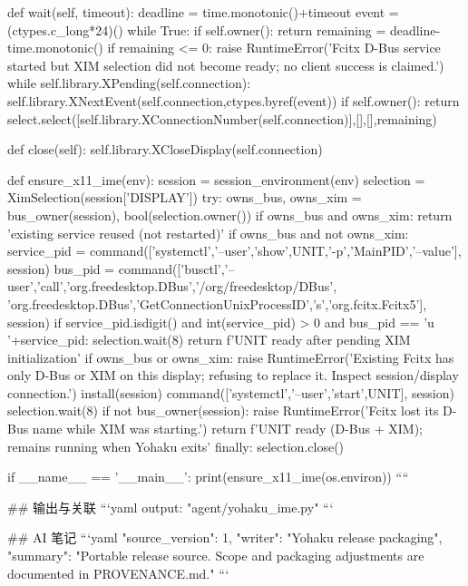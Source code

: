     def wait(self, timeout):
        deadline = time.monotonic()+timeout
        event = (ctypes.c_long*24)()
        while True:
            if self.owner():
                return
            remaining = deadline-time.monotonic()
            if remaining <= 0:
                raise RuntimeError('Fcitx D-Bus service started but XIM selection did not become ready; no client success is claimed.')
            while self.library.XPending(self.connection):
                self.library.XNextEvent(self.connection,ctypes.byref(event))
            if self.owner():
                return
            select.select([self.library.XConnectionNumber(self.connection)],[],[],remaining)

    def close(self):
        self.library.XCloseDisplay(self.connection)


def ensure_x11_ime(env):
    session = session_environment(env)
    selection = XimSelection(session['DISPLAY'])
    try:
        owns_bus, owns_xim = bus_owner(session), bool(selection.owner())
        if owns_bus and owns_xim:
            return 'existing service reused (not restarted)'
        if owns_bus and not owns_xim:
            service_pid = command(['systemctl','--user','show',UNIT,'-p','MainPID','--value'], session)
            bus_pid = command(['busctl','--user','call','org.freedesktop.DBus','/org/freedesktop/DBus',
                               'org.freedesktop.DBus','GetConnectionUnixProcessID','s','org.fcitx.Fcitx5'], session)
            if service_pid.isdigit() and int(service_pid) > 0 and bus_pid == 'u '+service_pid:
                selection.wait(8)
                return f'{UNIT} ready after pending XIM initialization'
        if owns_bus or owns_xim:
            raise RuntimeError('Existing Fcitx has only D-Bus or XIM on this display; refusing to replace it. Inspect session/display connection.')
        install(session)
        command(['systemctl','--user','start',UNIT], session)
        selection.wait(8)
        if not bus_owner(session):
            raise RuntimeError('Fcitx lost its D-Bus name while XIM was starting.')
        return f'{UNIT} ready (D-Bus + XIM); remains running when Yohaku exits'
    finally:
        selection.close()


if __name__ == '__main__':
    print(ensure_x11_ime(os.environ))
````

## 输出与关联
```yaml
output: "agent/yohaku_ime.py"
```

## AI 笔记
```yaml
{"source_version": 1, "writer": "Yohaku release packaging", "summary": "Portable release source. Scope and packaging adjustments are documented in PROVENANCE.md."}
```
